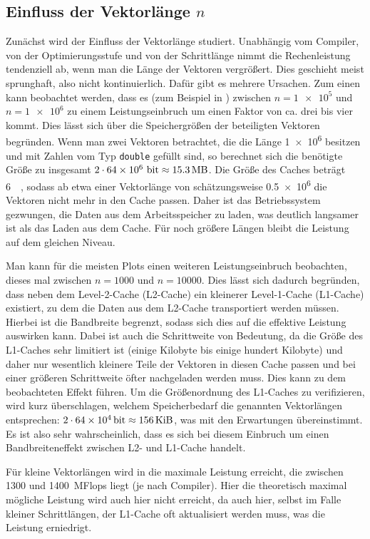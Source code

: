 \subsection{Einfluss der Vektorlänge $n$}
Zunächst wird der Einfluss der Vektorlänge studiert. Unabhängig vom Compiler, von
der Optimierungsstufe und von der Schrittlänge nimmt die Rechenleistung tendenziell
ab, wenn man die Länge der Vektoren vergrößert. Dies geschieht meist sprunghaft,
also nicht kontinuierlich. Dafür gibt es mehrere Ursachen. Zum einen kann beobachtet
werden, dass es (zum Beispiel in ) zwischen $n=\num{1e5}$ und
$n=\num{1e6}$ zu einem Leistungseinbruch um einen Faktor von ca. drei bis vier kommt.
Dies lässt sich über die Speichergrößen der beteiligten Vektoren begründen. Wenn 
man zwei Vektoren betrachtet, die die Länge \num{1e6} besitzen und mit Zahlen vom Typ
\texttt{double} gefüllt sind, so berechnet sich die benötigte Größe zu insgesamt
$2\cdot \num{64e6}\mbox{~bit}\approx \SI{15.3}{\mega\byte}$. Die Größe des Caches 
beträgt \SI{6}{\mega\byte}, sodass ab etwa einer Vektorlänge von schätzungsweise \num{0.5e6} die 
Vektoren nicht mehr in den Cache passen. Daher ist das Betriebssystem gezwungen,
die Daten aus dem Arbeitsspeicher zu laden, was deutlich langsamer ist als das Laden
aus dem Cache. Für noch größere Längen bleibt die Leistung auf dem gleichen Niveau.

Man kann für die meisten Plots einen weiteren Leistungseinbruch beobachten, dieses
mal zwischen $n=1000$ und $n=10000$. Dies lässt sich dadurch begründen, dass neben
dem Level-2-Cache (L2-Cache) ein kleinerer Level-1-Cache (L1-Cache) existiert, zu
dem die Daten aus dem L2-Cache transportiert werden müssen. Hierbei ist die Bandbreite
begrenzt, sodass sich dies auf die effektive Leistung auswirken kann. Dabei ist auch
die Schrittweite von Bedeutung, da die Größe des L1-Caches sehr limitiert ist (einige
Kilobyte bis einige hundert Kilobyte) und daher nur wesentlich kleinere Teile der
Vektoren in diesen Cache passen und bei einer größeren Schrittweite öfter nachgeladen
werden muss. Dies kann zu dem beobachteten Effekt führen. Um die Größenordnung des
L1-Caches zu verifizieren, wird kurz überschlagen, welchem Speicherbedarf die
genannten Vektorlängen entsprechen: $2\cdot\SI{64e4}{\bit} \approx 
\SI{156}{\kibi\byte}$, was mit den Erwartungen übereinstimmt. Es ist also sehr
wahrscheinlich, dass es sich bei diesem Einbruch um einen Bandbreiteneffekt zwischen
L2- und L1-Cache handelt.

Für kleine Vektorlängen wird in die maximale Leistung erreicht, die zwischen 1300
und \SI{1400}{MFlops} liegt (je nach Compiler). Hier die theoretisch maximal mögliche 
Leistung wird auch hier nicht erreicht, da auch hier, selbst im Falle kleiner 
Schrittlängen, der L1-Cache oft aktualisiert werden muss, was die Leistung erniedrigt.

